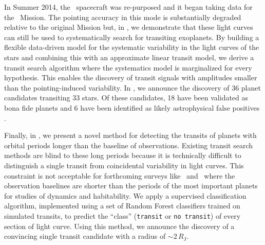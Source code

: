 In Summer 2014, the \kepler\ spacecraft was re-purposed and it began taking
data for the \KT\ Mission.
The pointing accuracy in this mode is substantially degraded relative to the
original Mission but, in , we demonstrate that these light curves
can still be used to systematically search for transiting exoplanets.
By building a flexible data-driven model for the systematic variability in the
light curves of the stars and combining this with an approximate linear
transit model, we derive a transit search algorithm where the systematics
model is marginalized for every hypothesis.
This enables the discovery of transit signals with amplitudes smaller than the
pointing-induced variability.
In , we announce the discovery of 36 planet candidates transiting
33 stars.
Of these candidates, 18 have been validated as bona fide planets and 6 have
been identified as likely astrophysical false positives
\citep{Crossfield:2015, Montet:2015, Armstrong:2015a}.

Finally, in , we present a novel method for detecting the
transits of planets with orbital periods longer than the baseline of
observations.
Existing transit search methods are blind to these long periods because it is
technically difficult to distinguish a single transit from coincidental
variability in light curves.
This constraint is not acceptable for forthcoming surveys like \KT\ and \tess\
where the observation baselines are shorter than the periods of the most
important planets for studies of dynamics and habitability.
We apply a supervised classification algorithm, implemented using a set of
Random Forest classifiers trained on simulated transits, to predict the
``class'' (\texttt{transit} or \texttt{no transit}) of every section of light
curve.
Using this method, we announce the discovery of a convincing single transit
candidate with a radius of $\sim 2\,R_\mathrm{J}$.


